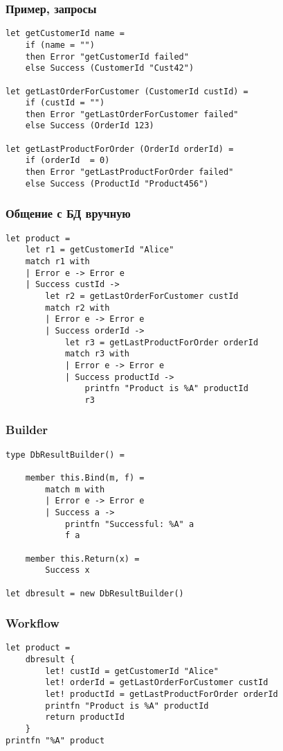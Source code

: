 \documentclass[xetex,mathserif,serif]{beamer}
\begin{document}
	\begin{frame}[fragile]
		\frametitle{Пример, запросы}
		\begin{verbatim}
let getCustomerId name =
    if (name = "") 
    then Error "getCustomerId failed"
    else Success (CustomerId "Cust42")

let getLastOrderForCustomer (CustomerId custId) =
    if (custId = "") 
    then Error "getLastOrderForCustomer failed"
    else Success (OrderId 123)

let getLastProductForOrder (OrderId orderId) =
    if (orderId  = 0) 
    then Error "getLastProductForOrder failed"
    else Success (ProductId "Product456")
		\end{verbatim}
	\end{frame}

	\begin{frame}[fragile]
		\frametitle{Общение с БД вручную}
		\begin{verbatim}
let product = 
    let r1 = getCustomerId "Alice"
    match r1 with 
    | Error e -> Error e
    | Success custId ->
        let r2 = getLastOrderForCustomer custId 
        match r2 with 
        | Error e -> Error e
        | Success orderId ->
            let r3 = getLastProductForOrder orderId 
            match r3 with 
            | Error e -> Error e
            | Success productId ->
                printfn "Product is %A" productId
                r3
		\end{verbatim}
	\end{frame}

	\begin{frame}[fragile]
		\frametitle{Builder}
		\begin{verbatim}
type DbResultBuilder() =

    member this.Bind(m, f) = 
        match m with
        | Error e -> Error e
        | Success a -> 
            printfn "Successful: %A" a
            f a

    member this.Return(x) = 
        Success x

let dbresult = new DbResultBuilder()
		\end{verbatim}
	\end{frame}

	\begin{frame}[fragile]
		\frametitle{Workflow}
		\begin{verbatim}
let product = 
    dbresult {
        let! custId = getCustomerId "Alice"
        let! orderId = getLastOrderForCustomer custId
        let! productId = getLastProductForOrder orderId 
        printfn "Product is %A" productId
        return productId
    }
printfn "%A" product
		\end{verbatim}
	\end{frame}
\end{document}
